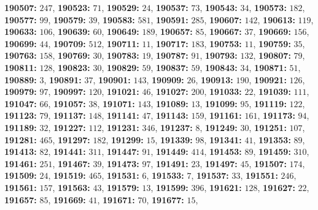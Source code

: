 \textsf{\bfseries 190507:} $247$, \textsf{\bfseries 190523:} $71$, \textsf{\bfseries 190529:} $24$, \textsf{\bfseries 190537:} $73$, \textsf{\bfseries 190543:} $34$, \textsf{\bfseries 190573:} $182$, \textsf{\bfseries 190577:} $99$, \textsf{\bfseries 190579:} $39$, \textsf{\bfseries 190583:} $581$, \textsf{\bfseries 190591:} $285$, \textsf{\bfseries 190607:} $142$, \textsf{\bfseries 190613:} $119$, \textsf{\bfseries 190633:} $106$, \textsf{\bfseries 190639:} $60$, \textsf{\bfseries 190649:} $189$, \textsf{\bfseries 190657:} $85$, \textsf{\bfseries 190667:} $37$, \textsf{\bfseries 190669:} $156$, \textsf{\bfseries 190699:} $44$, \textsf{\bfseries 190709:} $512$, \textsf{\bfseries 190711:} $11$, \textsf{\bfseries 190717:} $183$, \textsf{\bfseries 190753:} $11$, \textsf{\bfseries 190759:} $35$, \textsf{\bfseries 190763:} $158$, \textsf{\bfseries 190769:} $30$, \textsf{\bfseries 190783:} $19$, \textsf{\bfseries 190787:} $91$, \textsf{\bfseries 190793:} $132$, \textsf{\bfseries 190807:} $79$, \textsf{\bfseries 190811:} $128$, \textsf{\bfseries 190823:} $30$, \textsf{\bfseries 190829:} $59$, \textsf{\bfseries 190837:} $59$, \textsf{\bfseries 190843:} $34$, \textsf{\bfseries 190871:} $51$, \textsf{\bfseries 190889:} $3$, \textsf{\bfseries 190891:} $37$, \textsf{\bfseries 190901:} $143$, \textsf{\bfseries 190909:} $26$, \textsf{\bfseries 190913:} $190$, \textsf{\bfseries 190921:} $126$, \textsf{\bfseries 190979:} $97$, \textsf{\bfseries 190997:} $120$, \textsf{\bfseries 191021:} $46$, \textsf{\bfseries 191027:} $200$, \textsf{\bfseries 191033:} $22$, \textsf{\bfseries 191039:} $111$, \textsf{\bfseries 191047:} $66$, \textsf{\bfseries 191057:} $38$, \textsf{\bfseries 191071:} $143$, \textsf{\bfseries 191089:} $13$, \textsf{\bfseries 191099:} $95$, \textsf{\bfseries 191119:} $122$, \textsf{\bfseries 191123:} $79$, \textsf{\bfseries 191137:} $148$, \textsf{\bfseries 191141:} $47$, \textsf{\bfseries 191143:} $159$, \textsf{\bfseries 191161:} $161$, \textsf{\bfseries 191173:} $94$, \textsf{\bfseries 191189:} $32$, \textsf{\bfseries 191227:} $112$, \textsf{\bfseries 191231:} $346$, \textsf{\bfseries 191237:} $8$, \textsf{\bfseries 191249:} $30$, \textsf{\bfseries 191251:} $107$, \textsf{\bfseries 191281:} $465$, \textsf{\bfseries 191297:} $182$, \textsf{\bfseries 191299:} $15$, \textsf{\bfseries 191339:} $98$, \textsf{\bfseries 191341:} $41$, \textsf{\bfseries 191353:} $89$, \textsf{\bfseries 191413:} $82$, \textsf{\bfseries 191441:} $311$, \textsf{\bfseries 191447:} $91$, \textsf{\bfseries 191449:} $414$, \textsf{\bfseries 191453:} $89$, \textsf{\bfseries 191459:} $310$, \textsf{\bfseries 191461:} $251$, \textsf{\bfseries 191467:} $39$, \textsf{\bfseries 191473:} $97$, \textsf{\bfseries 191491:} $23$, \textsf{\bfseries 191497:} $45$, \textsf{\bfseries 191507:} $174$, \textsf{\bfseries 191509:} $24$, \textsf{\bfseries 191519:} $465$, \textsf{\bfseries 191531:} $6$, \textsf{\bfseries 191533:} $7$, \textsf{\bfseries 191537:} $33$, \textsf{\bfseries 191551:} $246$, \textsf{\bfseries 191561:} $157$, \textsf{\bfseries 191563:} $43$, \textsf{\bfseries 191579:} $13$, \textsf{\bfseries 191599:} $396$, \textsf{\bfseries 191621:} $128$, \textsf{\bfseries 191627:} $22$, \textsf{\bfseries 191657:} $85$, \textsf{\bfseries 191669:} $41$, \textsf{\bfseries 191671:} $70$, \textsf{\bfseries 191677:} $15$, 
